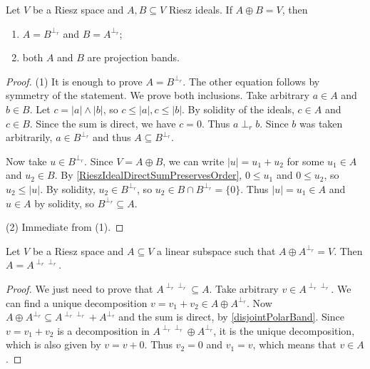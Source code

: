 \begin{proposition} \label{complementaryRieszIdealsProjectionBands}
Let $V$ be a Riesz space and $A,B\subseteq V$ Riesz ideals. If $A \oplus B = V$, then
\begin{enumerate}
\item $A = B^{\perp_r}$ and $B = A^{\perp_r}$;
\item both $A$ and $B$ are projection bands.
\end{enumerate}
\end{proposition}
\begin{proof}
(1) It is enough to prove $A = B^{\perp_r}$. The other equation follows by symmetry of the statement. We prove both inclusions. Take arbitrary $a\in A$ and $b\in B$. Let $c = |a|\wedge |b|$, so $c\leq |a|, c\leq |b|$. By solidity of the ideals, $c\in A$ and $c\in B$. Since the sum is direct, we have $c = 0$. Thus $a\perp_r b$. Since $b$ was taken arbitrarily, $a\in B^{\perp_r}$ and thus $A\subseteq B^{\perp_r}$.

Now take $u\in B^{\perp_r}$. Since $V = A\oplus B$, we can write $|u| = u_1 + u_2$ for some $u_1\in A$ and $u_2\in B$. By \ref{RieszIdealDirectSumPreservesOrder}, $0\leq u_1$ and $0\leq u_2$, so $u_2 \leq |u|$. By solidity, $u_2\in B^{\perp_r}$, so $u_2\in B\cap B^{\perp_r} = \{0\}$. Thus $|u| = u_1\in A$ and $u\in A$ by solidity, so $B^{\perp_r} \subseteq A$.

(2) Immediate from (1).
\end{proof}

\begin{proposition}
Let $V$ be a Riesz space and $A\subseteq V$ a linear subspace such that $A\oplus A^{\perp_r} = V$. Then $A = A^{\perp_r\perp_r}$.
\end{proposition}
\begin{proof}
We just need to prove that $A^{\perp_r\perp_r} \subseteq A$. Take arbitrary $v\in A^{\perp_r\perp_r}$. We can find a unique decomposition $v= v_1+v_2 \in A\oplus A^{\perp_r}$. Now $A\oplus A^{\perp_r} \subseteq A^{\perp_r\perp_r}+ A^{\perp_r}$ and the sum is direct, by \ref{disjointPolarBand}. Since $v= v_1+v_2$ is a decomposition in $A^{\perp_r\perp_r}\oplus A^{\perp_r}$, it is the unique decomposition, which is also given by $v= v+0$. Thus $v_2 = 0$ and $v_1 = v$, which means that $v\in A$.
\end{proof}

